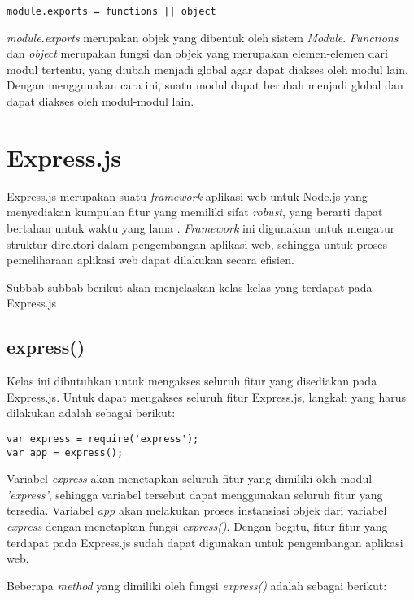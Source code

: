 \begin{lstlisting}
module.exports = functions || object
\end{lstlisting}

\textit{module.exports} merupakan objek yang dibentuk oleh sistem \textit{Module}. \textit{Functions} dan \textit{object} merupakan fungsi dan objek yang merupakan elemen-elemen dari modul tertentu, yang diubah menjadi global agar dapat diakses oleh modul lain. Dengan menggunakan cara ini, suatu modul dapat berubah menjadi global dan dapat diakses oleh modul-modul lain.


\section{Express.js}
\label{sec:Express.js}

Express.js merupakan suatu \textit{framework} aplikasi web untuk Node.js yang menyediakan kumpulan fitur yang memiliki sifat \textit{robust}, yang berarti dapat bertahan untuk waktu yang lama \cite{tj:10:expressjs}. \textit{Framework} ini digunakan untuk mengatur struktur direktori dalam pengembangan aplikasi web, sehingga untuk proses pemeliharaan aplikasi web dapat dilakukan secara efisien. 

Subbab-subbab berikut akan menjelaskan kelas-kelas yang terdapat pada Express.js

\subsection{express()}
Kelas ini dibutuhkan untuk mengakses seluruh fitur yang disediakan pada Express.js. Untuk dapat mengakses seluruh fitur Express.js, langkah yang harus dilakukan adalah sebagai berikut: 
\begin{lstlisting}
var express = require('express');
var app = express();
\end{lstlisting}

Variabel \textit{express} akan menetapkan seluruh fitur yang dimiliki oleh modul \textit{'express'}, sehingga variabel tersebut dapat menggunakan seluruh fitur yang tersedia. Variabel \textit{app} akan melakukan proses instansiasi objek dari variabel \textit{express} dengan menetapkan fungsi \textit{express()}. Dengan begitu, fitur-fitur yang terdapat pada Express.js sudah dapat digunakan untuk pengembangan aplikasi web.

Beberapa \textit{method} yang dimiliki oleh fungsi \textit{express()} adalah sebagai berikut:

